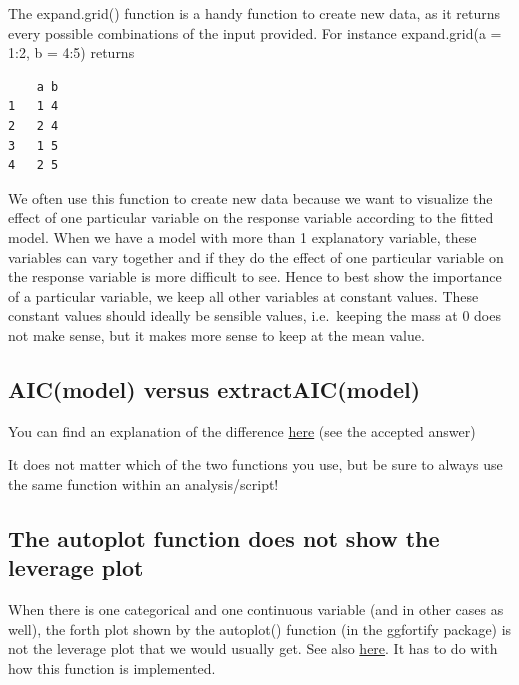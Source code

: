\documentclass[
  letterpaper,
  8pt,
  a4paper]{book}
\begin{document}
The expand.grid() function is a handy function to create new data, as it
returns every possible combinations of the input provided. For instance
expand.grid(a = 1:2, b = 4:5) returns

\begin{verbatim}
    a b
1   1 4
2   2 4
3   1 5
4   2 5
\end{verbatim}

We often use this function to create new data because we want to
visualize the effect of one particular variable on the response variable
according to the fitted model. When we have a model with more than 1
explanatory variable, these variables can vary together and if they do
the effect of one particular variable on the response variable is more
difficult to see. Hence to best show the importance of a particular
variable, we keep all other variables at constant values. These constant
values should ideally be sensible values, i.e.~keeping the mass at 0
does not make sense, but it makes more sense to keep at the mean value.

\subsection*{AIC(model) versus
extractAIC(model)}\label{aicmodel-versus-extractaicmodel}

You can find an explanation of the difference
\href{https://stats.stackexchange.com/questions/43733/what-is-the-difference-between-aic-and-extractaic-in-r}{here}
(see the accepted answer)

It does not matter which of the two functions you use, but be sure to
always use the same function within an analysis/script!

\subsection*{The autoplot function does not show the leverage
plot}\label{the-autoplot-function-does-not-show-the-leverage-plot}

When there is one categorical and one continuous variable (and in other
cases as well), the forth plot shown by the autoplot() function (in the
ggfortify package) is not the leverage plot that we would usually get.
See also
\href{http://r4all.org/posts/diagnostic-plots-of-models-with-categotical-explanatory-variables/}{here}.
It has to do with how this function is implemented.
\end{document}
